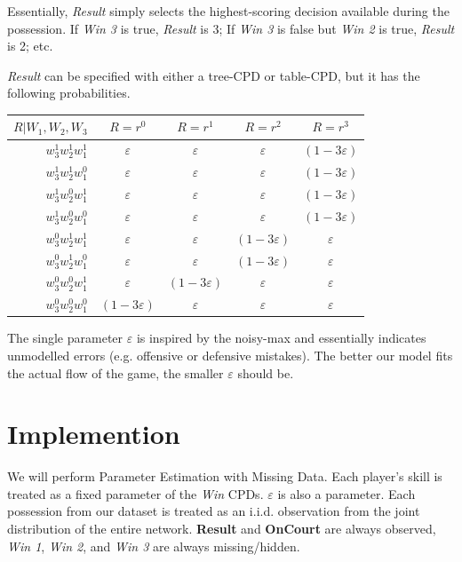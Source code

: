 \documentclass[10pt,twocolumn]{article}
\begin{document}
Essentially, \emph{Result} simply selects the highest-scoring decision available during the possession.
If \emph{Win 3} is true, \emph{Result} is 3; If \emph{Win 3} is false but \emph{Win 2} is true, \emph{Result} is 2; etc.

\emph{Result} can be specified with either a tree-CPD or table-CPD, but it has the following probabilities.

\begin{tabular}{ r|c c c c|}
$R|W_1,W_2,W_3$ & $R=r^0$ & $R=r^1$ & $R=r^2$ & $R=r^3$ \\  \hline
$w^1_3 w^1_2 w^1_1$ & $\varepsilon$ &  $\varepsilon$ &  $\varepsilon$ & $(1 - 3 \varepsilon)$ \\ \hline
$w^1_3 w^1_2 w^0_1$ & $\varepsilon$ &  $\varepsilon$ &  $\varepsilon$ & $(1 - 3 \varepsilon)$ \\ \hline
$w^1_3 w^0_2 w^1_1$ & $\varepsilon$ &  $\varepsilon$ &  $\varepsilon$ & $(1 - 3 \varepsilon)$ \\ \hline
$w^1_3 w^0_2 w^0_1$ & $\varepsilon$ &  $\varepsilon$ &  $\varepsilon$ & $(1 - 3 \varepsilon)$ \\ \hline
$w^0_3 w^1_2 w^1_1$ & $\varepsilon$ &  $\varepsilon$ &  $(1 - 3 \varepsilon)$ & $\varepsilon$ \\ \hline
$w^0_3 w^1_2 w^0_1$ & $\varepsilon$ &  $\varepsilon$ &  $(1 - 3 \varepsilon)$ & $\varepsilon$ \\ \hline
$w^0_3 w^0_2 w^1_1$ & $\varepsilon$ & $(1 - 3 \varepsilon)$   & $\varepsilon$ & $\varepsilon$ \\ \hline
$w^0_3 w^0_2 w^0_1$ & $(1 - 3 \varepsilon)$ & $\varepsilon$   & $\varepsilon$ & $\varepsilon$ \\ \hline
\end{tabular}


The single parameter $\varepsilon$ is inspired by the noisy-max and essentially indicates unmodelled errors (e.g. offensive or defensive mistakes).
The better our model fits the actual flow of the game, the smaller $\varepsilon$ should be.



\section{Implemention}

We will perform Parameter Estimation with Missing Data.
Each player's skill is treated as a fixed parameter of the \emph{Win} CPDs.
$\varepsilon$ is also a parameter.
Each possession from our dataset is treated as an i.i.d. observation from the joint distribution of the entire network.
{\bf Result} and {\bf OnCourt} are always observed, \emph{Win 1}, \emph{Win 2}, and \emph{Win 3} are always missing/hidden.
\end{document}
